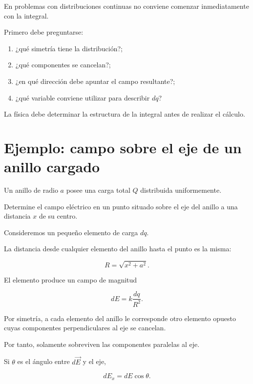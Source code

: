 \begin{idea}

En problemas con distribuciones continuas no conviene comenzar inmediatamente con
la integral.

Primero debe preguntarse:

\begin{enumerate}
    \item ¿qué simetría tiene la distribución?;
    \item ¿qué componentes se cancelan?;
    \item ¿en qué dirección debe apuntar el campo resultante?;
    \item ¿qué variable conviene utilizar para describir \(dq\)?
\end{enumerate}

La física debe determinar la estructura de la integral antes de realizar el cálculo.

\end{idea}


\section{Ejemplo: campo sobre el eje de un anillo cargado}

\begin{ejemplo}

Un anillo de radio \(a\) posee una carga total \(Q\) distribuida uniformemente.

Determine el campo eléctrico en un punto situado sobre el eje del anillo a una
distancia \(x\) de su centro.

\end{ejemplo}

Consideremos un pequeño elemento de carga \(dq\).

La distancia desde cualquier elemento del anillo hasta el punto es la misma:

\[
R=\sqrt{x^2+a^2}.
\]

El elemento produce un campo de magnitud

\[
dE=k\frac{dq}{R^2}.
\]

Por simetría, a cada elemento del anillo le corresponde otro elemento opuesto cuyas
componentes perpendiculares al eje se cancelan.

Por tanto, solamente sobreviven las componentes paralelas al eje.

Si \(\theta\) es el ángulo entre \(d\vec E\) y el eje,

\[
dE_x=dE\cos\theta.
\]

